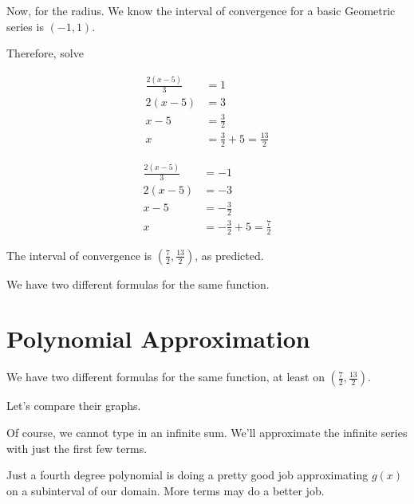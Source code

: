 \documentclass{ximera}
\begin{document}
\begin{example}
\begin{explanation}
Now, for the radius.  We know the interval of convergence for a basic Geometric series is $(-1, 1)$.


Therefore, solve



\begin{align*}
\frac{2(x-5)}{3} & = 1   \\
2(x-5) & = 3    \\
x-5 & = \frac{3}{2}    \\
x & = \frac{3}{2}  + 5 = \frac{13}{2}
\end{align*}




\begin{align*}
\frac{2(x-5)}{3} & = -1   \\
2(x-5) & = -3    \\
x-5 & = -\frac{3}{2}    \\
x & = -\frac{3}{2}  + 5 = \frac{7}{2}
\end{align*}




The interval of convergence is $\left( \frac{7}{2}, \frac{13}{2}\right)$, as predicted.



\end{explanation}

\end{example}


We have two different formulas for the same function.






















\section{Polynomial Approximation}


We have two different formulas for the same function, at least on $\left( \frac{7}{2}, \frac{13}{2}\right)$.


Let's compare their graphs.

Of course, we cannot type in an infinite sum.  We'll approximate the infinite series with just the first few terms.




\begin{center}
\end{center}


Just a fourth degree polynomial is doing a pretty good job approximating $g(x)$ on a subinterval of our domain.  More terms may do a better job.
\end{document}
